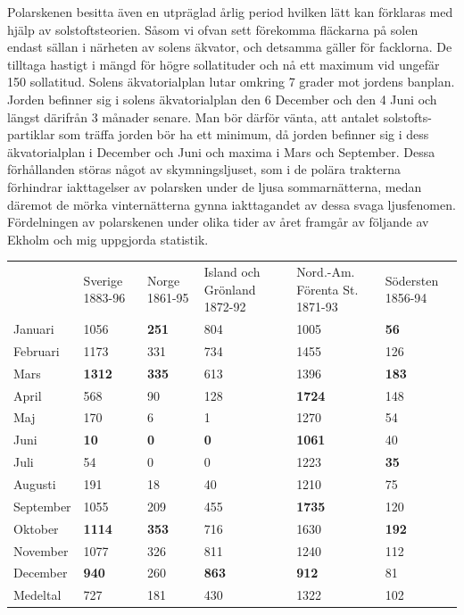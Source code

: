 \documentclass[a4paper, 12pt, oneside, swedish]{article}
\begin{document}
Polarskenen besitta även en utpräglad årlig period hvilken lätt kan förklaras med hjälp av solstoftsteorien. Såsom vi ofvan sett förekomma fläckarna på solen endast sällan i närheten av solens äkvator, och detsamma gäller för facklorna. De tilltaga hastigt i mängd för högre sollatituder och nå ett maximum vid ungefär 150 sollatitud. Solens äkvatorialplan lutar omkring 7 grader mot jordens banplan. Jorden befinner sig i solens äkvatorialplan den 6 December och den 4 Juni och längst därifrån 3 månader senare. Man bör därför vänta, att antalet solstofts-partiklar som träffa jorden bör ha ett minimum, då jorden befinner sig i dess äkvatorialplan i December och Juni och maxima i Mars och September. Dessa förhållanden störas något av skymningsljuset, som i de polära trakterna förhindrar iakttagelser av polarsken under de ljusa sommarnätterna, medan däremot de mörka vinternätterna gynna iakttagandet av dessa svaga ljusfenomen. Fördelningen av polarskenen under olika tider av året framgår av följande av Ekholm och mig uppgjorda statistik.

\begin{table}[H]
    \centering
    \footnotesize
    \Fontauri
    \begin{tabular}{p{15mm} p{15mm} p{15mm} p{18mm} p{18mm} p{15mm}}
        ~ & Sverige 1883-96 & Norge 1861-95 & Island och Grönland 1872-92 & Nord.-Am. Förenta St. 1871-93 & Södersten 1856-94 \\
        Januari & 1056 & \textbf{251} & 804 & 1005 & \textbf{56}  \\
        Februari & 1173 & 331 & 734 & 1455 & 126 \\
        Mars & \textbf{1312} & \textbf{335} & 613 & 1396 & \textbf{183}  \\
        April & 568 & 90 & 128 & \textbf{1724} & 148 \\
        Maj & 170 & 6 & 1 & 1270 & 54 \\
        Juni & \textbf{10} & \textbf{0} & \textbf{0} & \textbf{1061} & 40 \\
        Juli & 54 & 0 & 0 & 1223 & \textbf{35} \\
        Augusti & 191 & 18 & 40 & 1210 & 75 \\
        September & 1055 & 209 & 455 & \textbf{1735} & 120 \\
        Oktober & \textbf{1114} & \textbf{353} & 716 & 1630 & \textbf{192} \\
        November & 1077 & 326 & 811 & 1240 & 112 \\
        December & \textbf{940} & 260 & \textbf{863} & \textbf{912} & 81 \\
        Medeltal & 727 & 181 & 430 & 1322 & 102 \\
    \end{tabular}
\end{table}
\end{document}
